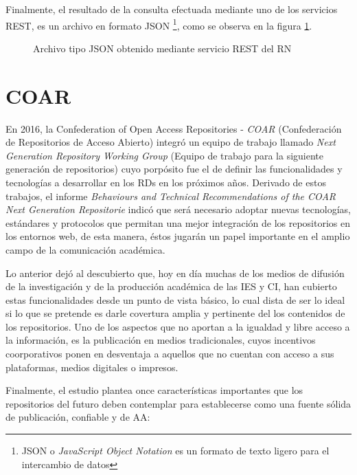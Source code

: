 Finalmente, el resultado de la consulta efectuada mediante uno de los servicios REST, es un archivo en formato JSON \footnote{JSON o \textit{JavaScript Object Notation} es un  formato de texto ligero para el intercambio de datos}, como se observa en la figura \ref{JSON_ejemplo_consumo_REST_RN}.

\begin{figure}[!ht]
    \centering
    \caption{Archivo tipo JSON obtenido mediante servicio REST del RN} %
    \label{JSON_ejemplo_consumo_REST_RN}
\end{figure}

\section{COAR}

En 2016, la Confederation of Open Access Repositories - \textit{COAR} (Confederaci\'on de Repositorios de Acceso Abierto) integr\'o un equipo de trabajo llamado \textit{Next Generation Repository Working Group} (Equipo de trabajo para la siguiente generaci\'on de repositorios) cuyo porp\'osito fue el de definir las funcionalidades y tecnolog\'ias a desarrollar en los RDs en los pr\'oximos años. Derivado de estos trabajos, el informe \textit{Behaviours and Technical Recommendations of the COAR Next Generation Repositorie} \cite{NextGenerationRepositories} indic\'o que ser\'a necesario adoptar nuevas tecnolog\'ias, est\'andares y protocolos que permitan una mejor integraci\'on de los repositorios en los entornos web, de esta manera, \'estos jugar\'an un papel importante en el amplio campo de la comunicaci\'on acad\'emica.

Lo anterior dej\'o al descubierto que, hoy en d\'ia muchas de los medios de difusi\'on de la investigaci\'on y de la producci\'on acad\'emica de las IES y CI, han cubierto estas funcionalidades desde un punto de vista b\'asico, lo cual dista de ser lo ideal si lo que se pretende es darle covertura amplia y pertinente del los contenidos de los repositorios. Uno de los aspectos que no aportan a la igualdad y libre acceso a la informaci\'on, es la publicaci\'on en medios tradicionales, cuyos incentivos coorporativos ponen en desventaja a aquellos que no cuentan con acceso a sus plataformas, medios digitales o impresos.

Finalmente, el estudio plantea once caracter\'isticas importantes que los repositorios del futuro deben contemplar para establecerse como una fuente s\'olida de publicaci\'on, confiable y de AA: \cite{NextGenerationRepositories}

